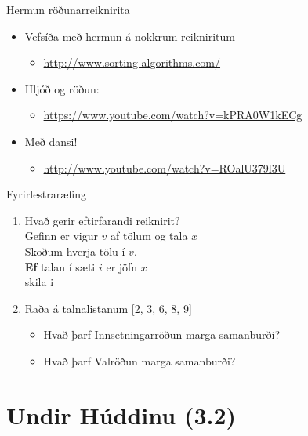 \documentclass{beamer}
\begin{document}
\begin{frame}{Hermun röðunarreiknirita}
\begin{itemize}
 \item Vefsíða með hermun á nokkrum reikniritum
 \begin{itemize}
  \item \url{http://www.sorting-algorithms.com/}
 \end{itemize}
 \item Hljóð og röðun:
 \begin{itemize}
  \item \url{https://www.youtube.com/watch?v=kPRA0W1kECg}
 \end{itemize}
 \item Með dansi!
 \begin{itemize}
  \item \url{http://www.youtube.com/watch?v=ROalU379l3U}
 \end{itemize}
\end{itemize}
\end{frame}

\begin{frame}{Fyrirlestraræfing}
\begin{enumerate}
 \item Hvað gerir eftirfarandi reiknirit?\\
 \vspace{\baselineskip}
 Gefinn er vigur $v$ af tölum og tala $x$\\
 Skoðum hverja tölu í $v$.\\
 \textbf{Ef} talan í sæti $i$ er jöfn $x$\\
 \quad skila i
 \item Raða á talnalistanum [2, 3, 6, 8, 9]
 \begin{itemize}
  \item Hvað þarf Innsetningarröðun marga samanburði?
  \item Hvað þarf Valröðun marga samanburði?
 \end{itemize}
\end{enumerate}
\end{frame}

\section{Undir Húddinu (3.2)}
\end{document}
